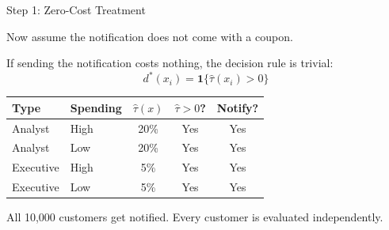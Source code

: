 \documentclass[aspectratio=169, 11pt, handout]{beamer}
\begin{document}
\begin{frame}{Step 1: Zero-Cost Treatment}

Now assume the notification does not come with a coupon.\\

\medskip

If sending the notification costs nothing, the decision rule is trivial:
\[
d^*(x_i) = \mathbf{1}\{\hat{\tau}(x_i) > 0\}
\]

\pause

\begin{center}
\begin{tabular}{llccc}
\toprule
\textbf{Type} & \textbf{Spending} & $\hat{\tau}(x)$ & $\hat{\tau} > 0$? & \textbf{Notify?} \\
\midrule
Analyst & High & 20\% & \textcolor{sbgreen}{Yes} & \textcolor{sbgreen}{Yes} \\
Analyst & Low & 20\% & \textcolor{sbgreen}{Yes} & \textcolor{sbgreen}{Yes} \\
Executive & High & 5\% & \textcolor{sbgreen}{Yes} & \textcolor{sbgreen}{Yes} \\
Executive & Low & 5\% & \textcolor{sbgreen}{Yes} & \textcolor{sbgreen}{Yes} \\
\bottomrule
\end{tabular}
\end{center}

\bigskip

All 10,000 customers get notified. Every customer is evaluated independently.

\end{frame}
\end{document}
